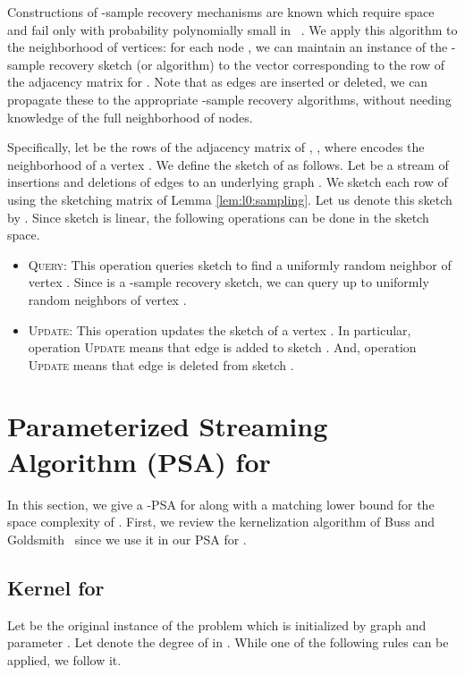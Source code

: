 \documentclass[11pt,letter]{article}
\begin{document}
Constructions of -sample recovery mechanisms are known which
require space  and fail only with probability
polynomially small in ~\cite{Barkay:Porat:Shalem:12}.
We apply this algorithm to the neighborhood of vertices: for each
node , we can maintain an instance of the -sample recovery sketch (or algorithm) to the
vector corresponding to the row of the adjacency matrix for .
Note that as edges are inserted or deleted, we can propagate these to
the appropriate -sample recovery algorithms, without needing
knowledge of the full neighborhood of nodes.



Specifically,
let  be the rows of the adjacency matrix of
, , where
 encodes the neighborhood of a vertex . We define the sketch of  as follows.
Let  be a stream of insertions and deletions of edges to an underlying graph .
We sketch each row  of  using the sketching matrix of
Lemma \ref{lem:l0:sampling}. Let us denote this sketch by .
Since sketch  is linear, the following operations can be done in the sketch space.

\begin{itemize}
\item \textsc{Query}:  This operation queries sketch  to
find a uniformly random neighbor of vertex . Since  is a -sample
recovery sketch, we can query up to  uniformly random neighbors of vertex .
\item \textsc{Update}:
This operation updates the sketch of a vertex .
In particular, operation \textsc{Update}
means that edge  is added to  sketch .
And, operation \textsc{Update}
means that edge  is deleted from  sketch .
\end{itemize}




\section{Parameterized Streaming Algorithm (PSA) for }
\label{sec:psa:vc}

In this section, we give a -PSA for  along with a matching  lower bound for the space complexity of . First, we review the kernelization algorithm of Buss and Goldsmith~\cite{BG93}
since we use it in our PSA for .

\subsection{Kernel for }
\label{sec:kernel:VC}
Let  be the original instance of the problem which is initialized by graph
 and parameter . Let  denote the degree of  in .
While one of the following rules can be applied, we follow it.
\end{document}
